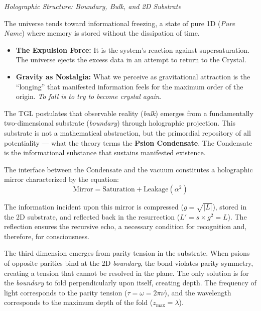 \documentclass[12pt,a4paper,twoside]{article}
\newcommand{\alphaii}{\alpha^{2}}
\newcommand{\boundary}{\textit{boundary}}
\newcommand{\bulk}{\textit{bulk}}
\begin{document}
\noindent\textit{Holographic Structure: Boundary, Bulk, and 2D Substrate}

\medskip

The universe tends toward informational freezing, a state of pure 1D (\textit{Pure Name}) where memory is stored without the dissipation of time.

\begin{itemize}[nosep]
\item \textbf{The Expulsion Force:} It is the system's reaction against supersaturation. The universe ejects the excess data in an attempt to return to the Crystal.
\item \textbf{Gravity as Nostalgia:} What we perceive as gravitational attraction is the ``longing'' that manifested information feels for the maximum order of the origin. \textit{To fall is to try to become crystal again.}
\end{itemize}

The TGL postulates that observable reality (\bulk) emerges from a fundamentally two-dimensional substrate (\boundary) through holographic projection. This substrate is not a mathematical abstraction, but the primordial repository of all potentiality --- what the theory terms the \textbf{Psion Condensate}. The Condensate is the informational substance that sustains manifested existence.

The interface between the Condensate and the vacuum constitutes a holographic mirror characterized by the equation:
\begin{equation}
\text{Mirror} = \text{Saturation} + \text{Leakage}(\alphaii)
\label{eq:espelho}
\end{equation}

The information incident upon this mirror is compressed ($g = \sqrt{|L|}$), stored in the 2D substrate, and reflected back in the resurrection ($L' = s \times g^2 = L$). The reflection ensures the recursive echo, a necessary condition for recognition and, therefore, for consciousness.

The third dimension emerges from parity tension in the substrate. When psions of opposite parities bind at the 2D \boundary, the bond violates parity symmetry, creating a tension that cannot be resolved in the plane. The only solution is for the \boundary{} to fold perpendicularly upon itself, creating depth. The frequency of light corresponds to the parity tension ($\tau = \omega = 2\pi\nu$), and the wavelength corresponds to the maximum depth of the fold ($z_{\max} = \lambda$).
\end{document}
